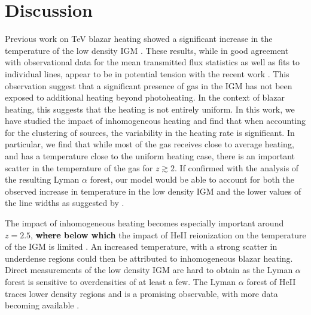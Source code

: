 \documentclass[numberedappendix]{emulateapj}
\newcommand\Ec[1]{{\color{magenta} \bf #1}} %
\begin{document}
\section{Discussion}
Previous work on TeV blazar heating showed a significant increase in the temperature of the low density IGM \citep{2012ApJ...752...23C,2012MNRAS.423..149P}. These results, while in good agreement with observational data for the mean transmitted flux statistics as well as fits to individual lines, appear to be in potential tension with the recent work \citep{2012ApJ...757L..30R}. This observation suggest that a significant presence of gas in the IGM has not been exposed to additional heating beyond photoheating. In the context of blazar heating, this suggests that the heating is not entirely uniform. In this work, we have studied the impact of inhomogeneous heating and find that when accounting for the clustering of sources, the variability in the heating rate is significant. In particular, we find that while most of the gas receives close to average heating, and has a temperature close to the uniform heating case, there is an important scatter in the temperature of the gas  for $z\gtrsim 2$. If confirmed with the analysis of the resulting Lyman $\alpha$ forest, our model would be able to account for both the observed increase in temperature in the low density IGM \citep{2014MNRAS.441.1916B,2009MNRAS.399L..39V} and the lower values of the line widths as suggested by \citet{2012ApJ...757L..30R}.

The impact of inhomogeneous heating becomes especially important around $z=2.5$, \Ec{\sout{where} below which} the impact of HeII reionization on the temperature of the IGM is limited \citep{2013MNRAS.435.3169C}. An increased temperature, with a strong scatter in underdense regions could then be attributed to inhomogeneous blazar heating. Direct measurements of the low density IGM are hard to obtain as the Lyman $\alpha$ forest is sensitive to overdensities of at least a few. The Lyman $\alpha$ forest of HeII traces lower density regions and is a promising observable, with more data becoming available \citep{2014arXiv1405.7405W}.

\end{document}
